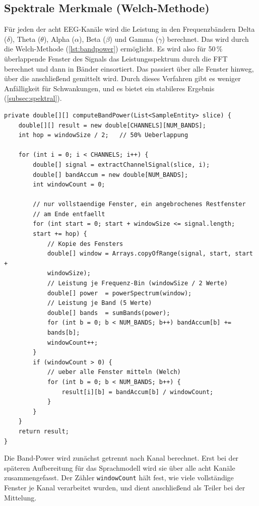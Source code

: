 \subsection{Spektrale Merkmale (Welch-Methode)} Für jeden der acht \ac{EEG}-Kanäle wird die Leistung in den Frequenzbändern Delta (\(\delta\)), Theta (\(\theta\)), Alpha (\(\alpha\)), Beta (\(\beta\)) und Gamma (\(\gamma\)) berechnet. Das wird durch die Welch-Methode (\autoref{lst:bandpower}) ermöglicht. Es wird also für 50\,\% überlappende Fenster des Signals das Leistungsspektrum durch die \ac{FFT} berechnet und dann in Bänder einsortiert. Das passiert über alle Fenster hinweg, über die anschließend gemittelt wird. Durch dieses Verfahren gibt es weniger Anfälligkeit für Schwankungen, und es bietet ein stabileres Ergebnis (\autoref{subsec:spektral}).
\begin{lstlisting}[style=code, caption={[Band-Power je Kanal]Band-Power je Kanal nach dem Welch-Verfahren. Das Signal wird in überlappende Fenster zerlegt, in Bänder einsortiert und gemittelt.}, label={lst:bandpower}]
private double[][] computeBandPower(List<SampleEntity> slice) {
    double[][] result = new double[CHANNELS][NUM_BANDS];
    int hop = windowSize / 2;   // 50% Ueberlappung

    for (int i = 0; i < CHANNELS; i++) {
        double[] signal = extractChannelSignal(slice, i);
        double[] bandAccum = new double[NUM_BANDS];
        int windowCount = 0;

        // nur vollstaendige Fenster, ein angebrochenes Restfenster
        // am Ende entfaellt
        for (int start = 0; start + windowSize <= signal.length;
        start += hop) {
            // Kopie des Fensters
            double[] window = Arrays.copyOfRange(signal, start, start +
            windowSize);
            // Leistung je Frequenz-Bin (windowSize / 2 Werte)
            double[] power  = powerSpectrum(window);
            // Leistung je Band (5 Werte)
            double[] bands  = sumBands(power);
            for (int b = 0; b < NUM_BANDS; b++) bandAccum[b] +=
            bands[b];
            windowCount++;
        }
        if (windowCount > 0) {
            // ueber alle Fenster mitteln (Welch)
            for (int b = 0; b < NUM_BANDS; b++) {
                result[i][b] = bandAccum[b] / windowCount;
            }
        }
    }
    return result;
}
\end{lstlisting}

\noindent Die Band-Power wird zunächst getrennt nach Kanal berechnet. Erst bei der späteren Aufbereitung für das Sprachmodell wird sie über alle acht Kanäle zusammengefasst. Der Zähler \texttt{windowCount} hält fest, wie viele vollständige Fenster je Kanal verarbeitet wurden, und dient anschließend als Teiler bei der Mittelung.
\vspace{\baselineskip}

